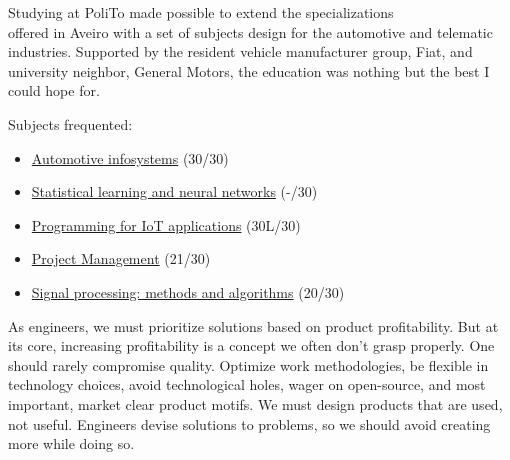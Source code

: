 \documentclass[10pt,a4paper,ragged2e,withhyper]{altacv}
\begin{document}
\begin{paracol}{2}
\divider


Studying at PoliTo made possible to extend the specializations \\ offered in Aveiro with a set of subjects design for the automotive and telematic industries. Supported by the resident vehicle manufacturer group, Fiat, and university neighbor, General Motors, the education was nothing but the best I could hope for.

Subjects frequented:

\small
\begin{itemize}
  \item \href{https://didattica.polito.it/pls/portal30/gap.pkg_guide.viewGap?p_cod_ins=01NIFLO}{Automotive infosystems} (30/30)
  \item \href{https://didattica.polito.it/pls/portal30/gap.pkg_guide.viewGap?p_cod_ins=01SOVBH&p_a_acc=2019&p_header=S}{Statistical learning and neural networks} (-/30)
  \item \href{https://didattica.polito.it/pls/portal30/sviluppo.guide.visualizza?p_cod_ins=01QWRMV&p_a_acc=2018&p_lang=EN}{Programming for IoT applications} (30L/30)
  \item \href{https://didattica.polito.it/pls/portal30/sviluppo.guide.visualizza?p_cod_ins=04IXTPH&p_a_acc=2013}{Project Management} (21/30)
  \item \href{https://didattica.polito.it/pls/portal30/sviluppo.guide.visualizza?p_cod_ins=01QWFBG&p_a_acc=2016&p_lang=EN}{Signal processing: methods and algorithms} (20/30)
\end{itemize}

\divider


\switchcolumn



As engineers, we must prioritize solutions based on product profitability. 
But at its core, increasing profitability is a concept we often don't grasp properly. 
One should rarely compromise quality. Optimize work methodologies, be flexible in technology choices, avoid technological holes, wager on open-source, and most important, market clear product motifs. 
We must design products that are used, not useful. 
Engineers devise solutions to problems, so we should avoid creating more while doing so.


\end{paracol}
\end{document}

